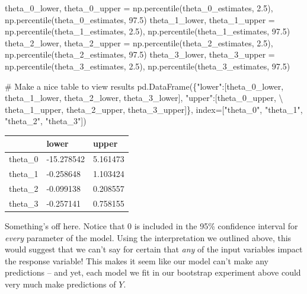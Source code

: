 \documentclass[
  letterpaper,
  DIV=11,
  numbers=noendperiod]{scrreprt}
\newenvironment{Shaded}{\begin{snugshade}}{\end{snugshade}}
\newcommand{\CommentTok}[1]{\textcolor[rgb]{0.37,0.37,0.37}{#1}}
\newcommand{\FloatTok}[1]{\textcolor[rgb]{0.68,0.00,0.00}{#1}}
\newcommand{\NormalTok}[1]{\textcolor[rgb]{0.00,0.23,0.31}{#1}}
\newcommand{\OperatorTok}[1]{\textcolor[rgb]{0.37,0.37,0.37}{#1}}
\newcommand{\StringTok}[1]{\textcolor[rgb]{0.13,0.47,0.30}{#1}}
\begin{document}
\begin{Shaded}
\begin{Highlighting}[]
\NormalTok{theta\_0\_lower, theta\_0\_upper }\OperatorTok{=}\NormalTok{ np.percentile(theta\_0\_estimates, }\FloatTok{2.5}\NormalTok{), np.percentile(theta\_0\_estimates, }\FloatTok{97.5}\NormalTok{)}
\NormalTok{theta\_1\_lower, theta\_1\_upper }\OperatorTok{=}\NormalTok{ np.percentile(theta\_1\_estimates, }\FloatTok{2.5}\NormalTok{), np.percentile(theta\_1\_estimates, }\FloatTok{97.5}\NormalTok{)}
\NormalTok{theta\_2\_lower, theta\_2\_upper }\OperatorTok{=}\NormalTok{ np.percentile(theta\_2\_estimates, }\FloatTok{2.5}\NormalTok{), np.percentile(theta\_2\_estimates, }\FloatTok{97.5}\NormalTok{)}
\NormalTok{theta\_3\_lower, theta\_3\_upper }\OperatorTok{=}\NormalTok{ np.percentile(theta\_3\_estimates, }\FloatTok{2.5}\NormalTok{), np.percentile(theta\_3\_estimates, }\FloatTok{97.5}\NormalTok{)}

\CommentTok{\# Make a nice table to view results}
\NormalTok{pd.DataFrame(\{}\StringTok{"lower"}\NormalTok{:[theta\_0\_lower, theta\_1\_lower, theta\_2\_lower, theta\_3\_lower], }\StringTok{"upper"}\NormalTok{:[theta\_0\_upper, }\OperatorTok{\textbackslash{}}
\NormalTok{                theta\_1\_upper, theta\_2\_upper, theta\_3\_upper]\}, index}\OperatorTok{=}\NormalTok{[}\StringTok{"theta\_0"}\NormalTok{, }\StringTok{"theta\_1"}\NormalTok{, }\StringTok{"theta\_2"}\NormalTok{, }\StringTok{"theta\_3"}\NormalTok{])}
\end{Highlighting}
\end{Shaded}

\begin{longtable}[]{@{}lll@{}}
\toprule\noalign{}
& lower & upper \\
\midrule\noalign{}
\endhead
\bottomrule\noalign{}
\endlastfoot
theta\_0 & -15.278542 & 5.161473 \\
theta\_1 & -0.258648 & 1.103424 \\
theta\_2 & -0.099138 & 0.208557 \\
theta\_3 & -0.257141 & 0.758155 \\
\end{longtable}

Something's off here. Notice that 0 is included in the 95\% confidence
interval for \emph{every} parameter of the model. Using the
interpretation we outlined above, this would suggest that we can't say
for certain that \emph{any} of the input variables impact the response
variable! This makes it seem like our model can't make any predictions
-- and yet, each model we fit in our bootstrap experiment above could
very much make predictions of \(Y\).
\end{document}
